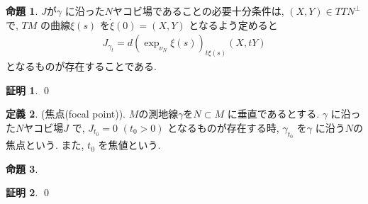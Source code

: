 \documentclass[10pt, fleqn, label-section=none]{bxjsarticle}
\theoremstyle{definition}
\newtheorem{dfn}{定義}[section]
\newtheorem{prop}[dfn]{命題}
\newtheorem*{pf*}{証明}
\renewcommand{\-}{\hyphen}
\begin{document}
\begin{prop}
$J$が$\gamma$ に沿った$N$ヤコビ場であることの必要十分条件は, $(X,Y) \in TTN^\perp$ で, $TM$ の曲線$\xi (s)$ を$\dot \xi (0) = (X,Y)$ となるよう定めると
\begin{align*} J_{\gamma_t} = d (\exp_{\nu_N} \xi (s)) _{t \xi (s)} (X, tY)\end{align*}
となるものが存在することである. 
\end{prop}
\begin{pf*}

\qed
\end{pf*}

\begin{dfn}(焦点(focal point)). $M$の測地線$\gamma$を$N \subset M$ に垂直であるとする. $\gamma$ に沿った$N$ヤコビ場$J$ で, $J_{t_0} = 0 \,\, (t_0 > 0)$ となるものが存在する時, $\gamma_{t_0}$ を$\gamma$ に沿う$N$の焦点という. また, $t_0$ を焦値という. 
\end{dfn}

\begin{prop}

\end{prop}
\begin{pf*}

\qed
\end{pf*}
\end{document}
